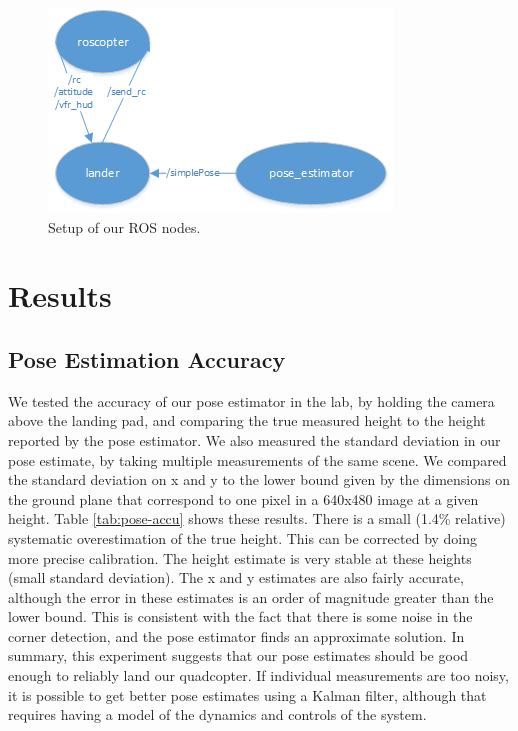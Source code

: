 \documentclass[10pt]{scrartcl} %
\begin{document}
\begin{figure}[h]
    \centering
    \includegraphics{images/rosnodes.png}
    \caption{Setup of our ROS nodes.}
    \label{fig:rosnodes}
\end{figure}

\section{Results}

\subsection{Pose Estimation Accuracy}

We tested the accuracy of our pose estimator in the lab, by holding the camera
above the landing pad, and comparing the true measured height to the height
reported by the pose estimator. We also measured the standard deviation in our
pose estimate, by taking multiple measurements of the same scene. We compared
the standard deviation on x and y to the lower bound given by the dimensions on
the ground plane that correspond to one pixel in a 640x480 image at a given
height. Table \ref{tab:pose-accu} shows these results. There is a small (1.4\%
relative) systematic overestimation of the true height. This can be corrected
by doing more precise calibration. The height estimate is very stable at these
heights (small standard deviation). The x and y estimates are also fairly
accurate, although the error in these estimates is an order of magnitude
greater than the lower bound. This is consistent with the fact that there is
some noise in the corner detection, and the pose estimator finds an approximate
solution. In summary, this experiment suggests that our pose estimates should
be good enough to reliably land our quadcopter. If individual measurements are
too noisy, it is possible to get better pose estimates using a Kalman filter,
although that requires having a model of the dynamics and controls of the
system.
\end{document}
